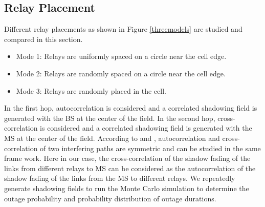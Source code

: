 \subsection{Relay Placement}
Different relay placements as shown in Figure \ref{threemodels} are studied and compared in this section.
\begin{itemize}
\item Mode 1: Relays are uniformly spaced on a circle near the cell edge.
    \item Mode 2: Relays are randomly spaced on a circle near the cell edge.
    \item Mode 3: Relays are randomly placed in the cell.
    \end{itemize}
In the first hop, autocorrelation is considered and a correlated shadowing field is generated with the BS at the center of the field. In the second hop, cross-correlation is considered and a correlated shadowing field is generated with the MS at the center of the field. According to \cite{yamamoto2006impact} and \cite{lopez2007resiliency}, autocorrelation and cross-correlation of two interfering paths are symmetric and can be studied in the same frame work. Here in our case, the cross-correlation of the shadow fading of the links from different relays to MS can be considered as the autocorrelation of the shadow fading of the links from the MS to different relays. We repeatedly generate shadowing fields to run the Monte Carlo simulation to determine the outage probability and probability distribution of outage durations.
